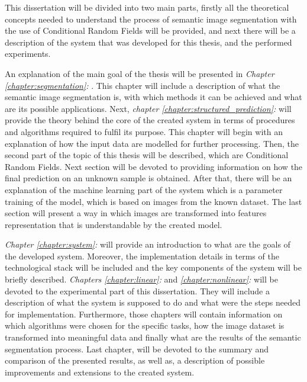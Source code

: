 This dissertation will be divided into two main parts, firstly all the theoretical concepts needed to understand the process of semantic image segmentation with the use of Conditional Random Fields will be provided, and next there will be a description of the system that was developed for this thesis, and the performed experiments.

An explanation of the main goal of the thesis will be presented in 
\textit{Chapter \ref{chapter:segmentation}: }. This chapter will include a description of what the semantic image segmentation is, with which methods it can be achieved and what are its possible applications. Next, \textit{chapter \ref{chapter:structured_prediction}: } will provide the theory behind the core of the created system in terms of procedures and algorithms required to fulfil its purpose. This chapter will begin with an explanation of how the input data are modelled for further processing. Then, the second part of the topic of this thesis will be described, which are Conditional Random Fields. Next section will be devoted to providing information on how the final prediction on an unknown sample is obtained. After that, there will be an explanation of the machine learning part of the system which is a parameter training of the model, which is based on images from the known dataset. The last section will present a way in which images are transformed into features representation that is understandable by the created model. 

\textit{Chapter \ref{chapter:system}: } will provide an introduction to what are the goals of the developed system. Moreover, the implementation details in terms of the technological stack will be included and the key components of the system will be briefly described. \textit{Chapters \ref{chapter:linear}: } and \textit{\ref{chapter:nonlinear}: } will be devoted to the experimental part of this dissertation. They will include a description of what the system is supposed to do and what were the steps needed for implementation. Furthermore, those chapters will contain information on which algorithms were chosen for the specific tasks, how the image dataset is transformed into meaningful data and finally what are the results of the semantic segmentation process. Last chapter, \textit{} will be devoted to the summary and comparison of the presented results, as well as, a description of possible improvements and extensions to the created system. 